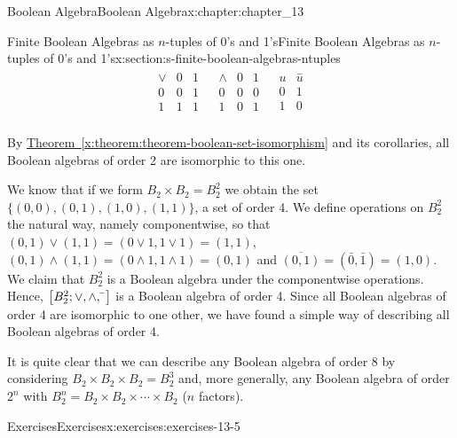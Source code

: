 \documentclass[oneside,10pt,]{book}
\newcommand{\xreffont}{\relax}
\numberwithin{equation}{section}
\begin{document}
\begin{chapterptx}{Boolean Algebra}{}{Boolean Algebra}{}{}{x:chapter:chapter_13}
\begin{sectionptx}{Finite Boolean Algebras as \(n\)-tuples of 0's and 1's}{}{Finite Boolean Algebras as \(n\)-tuples of 0's and 1's}{}{}{x:section:s-finite-boolean-algebras-ntuples}
\begin{equation*}
\begin{array}{lcr}
\begin{array}{c|cc}
\lor  & 0 & 1 \\
\hline
0 & 0 & 1 \\
1 & 1 & 1 \\
\end{array}  
& 
\begin{array}{c|cc}
\land  & 0 & 1 \\
\hline
0 & 0 & 0 \\
1 & 0 & 1 \\
\end{array}  
&
\begin{array}{c|c}
u & \overset{-}{u} \\
\hline
0 & 1 \\
1 & 0 \\
\end{array}
\end{array}
\end{equation*}
%
\par
By \hyperref[x:theorem:theorem-boolean-set-isomorphism]{Theorem~{\xreffont\ref{x:theorem:theorem-boolean-set-isomorphism}}} and its corollaries, all Boolean algebras of order 2 are isomorphic to this one.%
\par
We know that if we form \(B_2\times B_2=B_2^2\) we obtain the set \(\{(0, 0), (0, 1), (1, 0), (1, 1)\}\), a set of order 4. We define operations on \(B_2^2\) the natural way, namely componentwise, so that \((0, 1)\lor (1, 1)=(0\lor 1, 1\lor 1)=(1, 1)\), \((0, 1)\land (1, 1)=(0\land 1, 1\land 1)=(0, 1)\) and \(\overline{(0, 1)} = \left(\bar{0}, \bar{1}\right)=(1, 0)\). We claim that \(B_2^2\) is a Boolean algebra under the componentwise operations. Hence, \(\left[B_2^2; \lor , \land, \bar{}\hspace{3 pt}\right]\) is a Boolean algebra of order 4. Since all Boolean algebras of order 4 are isomorphic to one other, we have found a simple way of describing all Boolean algebras of order 4.%
\par
It is quite clear that we can describe any Boolean algebra of order 8 by considering \(B_2\times B_2\times B_2=B_2^3\) and, more generally, any Boolean algebra of order \(2^n\) with \(B_2^n=B_2\times B_2\times \cdots \times B_2\)  (\(n\) factors).%
%
%
\typeout{************************************************}
\typeout{************************************************}
%
\begin{exercises-subsection}{Exercises}{}{Exercises}{}{}{x:exercises:exercises-13-5}

\end{exercises-subsection}
\end{sectionptx}
\end{chapterptx}
\end{document}
